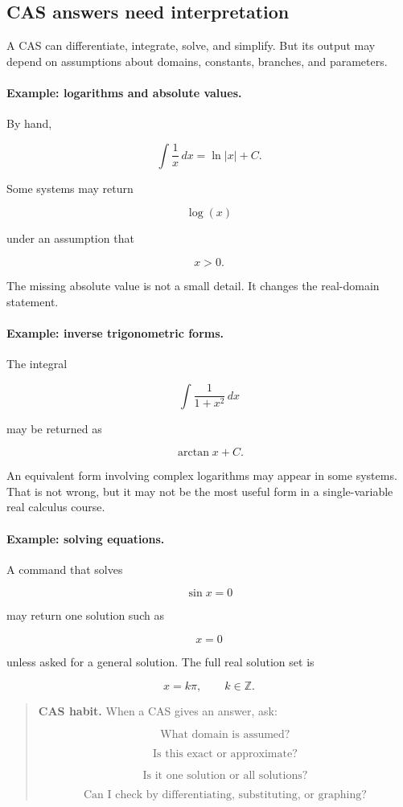 \subsection{CAS answers need interpretation}
\label{appsubsec:cas-interpretation}

A CAS can differentiate, integrate, solve, and simplify.  But its output may depend on
assumptions about domains, constants, branches, and parameters.

\paragraph{Example: logarithms and absolute values.}
By hand,

\[
\int \frac1x\,dx=\ln|x|+C.
\]

Some systems may return

\[
\log(x)
\]

under an assumption that

\[
x>0.
\]

The missing absolute value is not a small detail.  It changes the real-domain statement.

\paragraph{Example: inverse trigonometric forms.}
The integral

\[
\int \frac1{1+x^2}\,dx
\]

may be returned as

\[
\arctan x+C.
\]

An equivalent form involving complex logarithms may appear in some systems.  That is
not wrong, but it may not be the most useful form in a single-variable real calculus
course.

\paragraph{Example: solving equations.}
A command that solves

\[
\sin x=0
\]

may return one solution such as

\[
x=0
\]

unless asked for a general solution.  The full real solution set is

\[
x=k\pi,
\qquad k\in\mathbb Z.
\]

\begin{quote}
\textbf{CAS habit.}
When a CAS gives an answer, ask:

\[
\text{What domain is assumed?}
\]

\[
\text{Is this exact or approximate?}
\]

\[
\text{Is it one solution or all solutions?}
\]

\[
\text{Can I check by differentiating, substituting, or graphing?}
\]
\end{quote}

